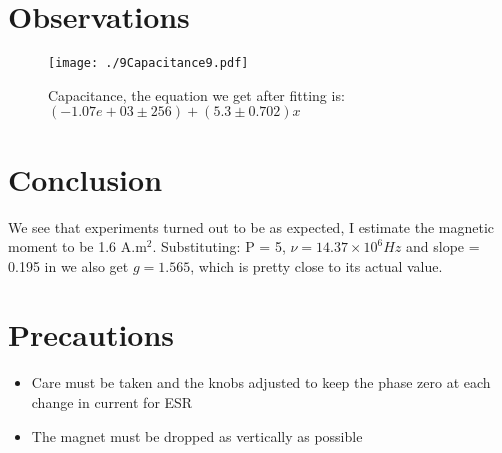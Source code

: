 \documentclass{double}
\begin{document}
\section{Observations}

\begin{figure}[H]
\centering
\texttt{[image: ./9Capacitance9.pdf]}
\caption{Capacitance, the equation we get after fitting is: $(-1.07e+03 \pm 256) + (5.3 \pm 0.702)x$}
\label{fig:"capacitance"}
\end{figure}
 
\section{Conclusion}

We see that experiments turned out to be as expected, I estimate the magnetic moment to be 1.6 A.m\(^2\). Substituting: P = 5, \(\nu = 14.37 \times 10^6 Hz\) and slope = 0.195 in we also get \(g = 1.565\), which is pretty close to its actual value.

\section{Precautions}

\begin{itemize}
\tightlist
\item
  Care must be taken and the knobs adjusted to keep the phase zero at each change in current for ESR
\item
  The magnet must be dropped as vertically as possible
\end{itemize}
\end{document}
